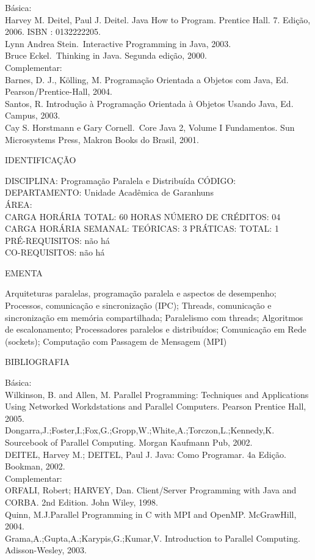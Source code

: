 \documentclass[
	12pt,				%
	openright,			%
  oneside,     %
	a4paper,			%
	chapter=TITLE,		%
	english,			%
	french,				%
	spanish,			%
	brazil				%
	]{abntex2}
\begin{document}
\begin{apendicesenv}
Básica:\\
Harvey M. Deitel, Paul J. Deitel. Java How to Program. Prentice Hall. 7.
Edição, 2006. ISBN : 0132222205.\\
Lynn Andrea Stein.~Interactive Programming in Java, 2003.\\
Bruce Eckel.~Thinking in Java. Segunda edição, 2000.\\
Complementar:\\
Barnes, D. J., Kölling, M. Programação Orientada a Objetos com Java, Ed.
Pearson/Prentice-Hall, 2004.\\
Santos, R. Introdução à Programação Orientada à Objetos Usando Java, Ed.
Campus, 2003.\\
Cay S. Horstmann e Gary Cornell.~Core Java 2, Volume I  Fundamentos.
Sun Microsystems Press, Makron Books do Brasil, 2001.

\newpage IDENTIFICAÇÃO

DISCIPLINA: Programação Paralela e Distribuída CÓDIGO:\\ 
DEPARTAMENTO: Unidade Acadêmica de Garanhuns\\
ÁREA: \\
CARGA HORÁRIA TOTAL: 60 HORAS NÚMERO DE CRÉDITOS: 04\\
CARGA HORÁRIA SEMANAL: TEÓRICAS: 3 PRÁTICAS: TOTAL: 1\\
PRÉ-REQUISITOS: não há\\
CO-REQUISITOS: não há

EMENTA 

Arquiteturas paralelas, programação paralela e aspectos de desempenho;
Processos, comunicação e sincronização (IPC); Threads, comunicação e
sincronização em memória compartilhada; Paralelismo com threads;
Algoritmos de escalonamento; Processadores paralelos e distribuídos;
Comunicação em Rede (sockets); Computação com Passagem de Mensagem
(MPI)

BIBLIOGRAFIA 

Básica:\\
Wilkinson, B. and Allen, M. Parallel Programming: Techniques and
Applications Using Networked Workdstations and Parallel Computers.
Pearson Prentice Hall, 2005.\\
Dongarra,J.;Foster,I.;Fox,G.;Gropp,W.;White,A.;Torczon,L.;Kennedy,K.
Sourcebook of Parallel Computing. Morgan Kaufmann Pub, 2002.\\
DEITEL, Harvey M.; DEITEL, Paul J. Java: Como Programar. 4a Edição.
Bookman, 2002.\\
Complementar:\\
ORFALI, Robert; HARVEY, Dan. Client/Server Programming with Java and
CORBA. 2nd Edition. John Wiley, 1998.\\
Quinn, M.J.Parallel Programming in C with MPI and OpenMP. McGrawHill,
2004.\\
Grama,A.;Gupta,A.;Karypis,G.;Kumar,V. Introduction to Parallel
Computing. Adisson-Wesley, 2003.


\end{apendicesenv}
\end{document}
